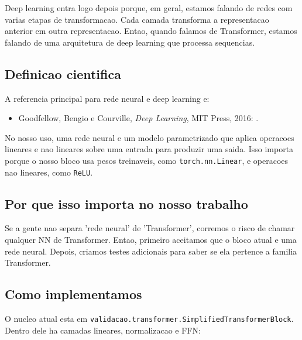 Deep learning entra logo depois porque, em geral, estamos falando de redes com varias etapas de transformacao. Cada camada transforma a representacao anterior em outra representacao. Entao, quando falamos de Transformer, estamos falando de uma arquitetura de deep learning que processa sequencias.



\subsection{Definicao cientifica}



A referencia principal para rede neural e deep learning e:


\begin{itemize}
\item Goodfellow, Bengio e Courville, \emph{Deep Learning}, MIT Press, 2016:
.
\end{itemize}





No nosso uso, uma rede neural e um modelo parametrizado que aplica operacoes lineares e nao lineares sobre uma entrada para produzir uma saida. Isso importa porque o nosso bloco usa pesos treinaveis, como \texttt{torch.\allowbreak{}nn.\allowbreak{}Linear}, e operacoes nao lineares, como \texttt{ReLU}.



\subsection{Por que isso importa no nosso trabalho}






Se a gente nao separa 'rede neural' de 'Transformer', corremos o risco de chamar qualquer NN de Transformer. Entao, primeiro aceitamos que o bloco atual e uma rede neural. Depois, criamos testes adicionais para saber se ela pertence a familia Transformer.



\subsection{Como implementamos}




O nucleo atual esta em \texttt{validacao.\allowbreak{}transformer.\allowbreak{}Simplified\allowbreak{}Transformer\allowbreak{}Block}. Dentro dele ha camadas lineares, normalizacao e FFN:



